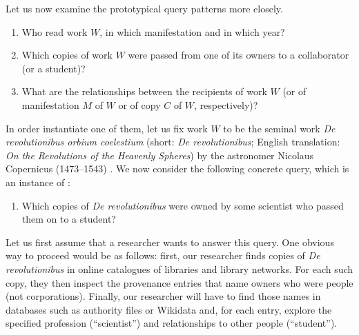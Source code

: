 Let us now examine the prototypical query patterns more closely.
%
\begin{enumerate}
  \item[\exaquery{1}]
    Who read work $W$, in which manifestation and in which year?
  \item[\exaquery{2}]
    Which copies of work $W$ were passed from one of its owners to a collaborator (or a student)?
  \item[\exaquery{3}]
    What are the relationships between the recipients of work $W$
    (or of manifestation $M$ of $W$ or of copy $C$ of $W$, respectively)?
\end{enumerate}
%
In order instantiate one of them, let us fix work $W$ to be the seminal work \emph{De revolutionibus orbium coelestium}
(short: \emph{De revolutionibus}; English translation: \emph{On the Revolutions of the Heavenly Spheres}) by the astronomer Nicolaus Copernicus (1473–1543) \autocite{Kopernikus1543}.
We now consider the following concrete query, which is an instance of :
%
\begin{enumerate}
  \item[\exaquery{2$'$}]
    Which copies of \emph{De revolutionibus} were owned by some scientist who passed them on to a student?
\end{enumerate}
%
Let us first assume that a researcher wants to answer this query.
One obvious way to proceed would be as follows: first, our researcher finds copies of \emph{De revolutionibus} 
in online catalogues of libraries and library networks. For each such copy, they then inspect the provenance entries
that name owners who were people (not corporations). Finally, our researcher will have to find those names in databases such as
authority files or Wikidata and, for each entry, explore the specified profession (\enquote{scientist})
and relationships to other people (\enquote{student}).

